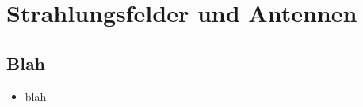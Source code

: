 \vspace{1cm}
\section{Strahlungsfelder und Antennen}
\subsection{Blah}
\begin{itemize}
    \itemsep0pt
    \item blah
\end{itemize}
